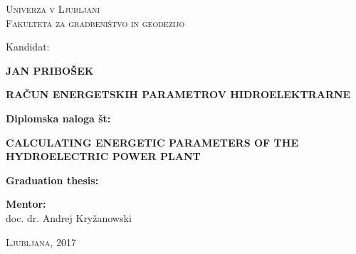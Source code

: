 \thispagestyle{empty}

\begin{minipage}{\textwidth}


\begin{center}
\vspace*{-1.5 cm}
\textsc{Univerza v Ljubljani}\\
\textsc{Fakulteta za gradbeništvo in geodezijo}

\vspace*{5cm}
Kandidat:\\
\vspace*{0.5cm}
\begin{large}
\textbf{JAN PRIBOŠEK}
\end{large}

\vspace*{1cm}

\begin{Large}
\textbf{RAČUN ENERGETSKIH PARAMETROV HIDROELEKTRARNE}
\end{Large}

\vspace*{0.5cm}

\begin{large}
\textbf{Diplomska naloga št:}
\end{large}

\vspace*{1cm}

\begin{Large}
	\textbf{CALCULATING ENERGETIC PARAMETERS OF THE HYDROELECTRIC POWER PLANT}
\end{Large}

\vspace*{0.5cm}

\begin{large}
	\textbf{Graduation thesis:}
\end{large}



\end{center}
\vspace*{8cm}


\begin{large}
	\textbf{Mentor:}\\
	doc. dr. Andrej Kryžanowski \\
\end{large}

\begin{center}
\textsc{Ljubljana, 2017}
\end{center}

\end{minipage}

\newpage
\thispagestyle{empty}
\cleardoublepage